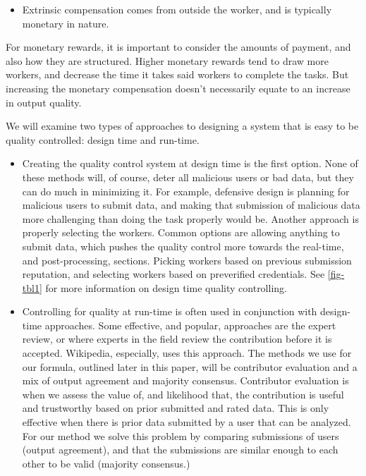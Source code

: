 \documentclass{sig-alternate-05-2015}
\begin{document}
\begin{itemize}
\begin{itemize}
			\item Extrinsic compensation comes from outside the worker, and is typically monetary in nature.
		\end{itemize}
		For monetary rewards, it is important to consider the amounts of payment, and also how they are structured. Higher monetary rewards tend to draw more workers, and decrease the time it takes said workers to complete the tasks. But increasing the monetary compensation doesn't necessarily equate to an increase in output quality. \cite{mason2010financial}
	\end{itemize}
	
	We will examine two types of approaches to designing a system that is easy to be quality controlled: design time and run-time. 
	
	\begin{itemize}
		\item Creating the quality control system at design time is the first option. None of these methods will, of course, deter all malicious users or bad data, but they can do much in minimizing it. For example, defensive design is planning for malicious users to submit data, and making that submission of malicious data more challenging than doing the task properly would be. Another approach is properly selecting the workers. Common options are allowing anything to submit data, which pushes the quality control more towards the real-time, and post-processing, sections. Picking workers based on previous submission reputation, and selecting workers based on preverified credentials. See \cref{fig-tbl1} for more information on design time quality controlling.
	
		\item Controlling for quality at run-time is often used in conjunction with design-time approaches. Some effective, and popular, approaches are the expert review, or where experts in the field review the contribution before it is accepted. Wikipedia, especially, uses this approach. The methods we use for our formula, outlined later in this paper, will be contributor evaluation and a mix of output agreement and majority consensus. Contributor evaluation is when we assess the value of, and likelihood that, the contribution is useful and trustworthy based on prior submitted and rated data. This is only effective when there is prior data submitted by a user that can be analyzed. For our method we solve this problem by comparing submissions of users (output agreement), and that the submissions are similar enough to each other to be valid (majority consensus.)
	\end{itemize}
	
\end{document}
